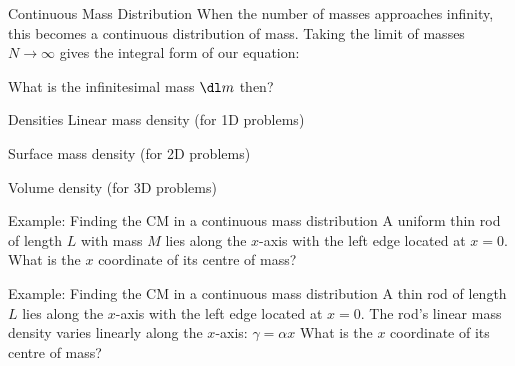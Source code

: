 \documentclass[12pt,compress,aspectratio=169]{beamer}
\begin{document}
\begin{frame}{Continuous Mass Distribution}
  When the number of masses approaches infinity, this becomes a continuous
  distribution of mass. Taking the limit of masses $N\rightarrow\infty$ gives
  the integral form of our equation:


  What is the infinitesimal mass $\dl m$ then?
\end{frame}



\begin{frame}{Densities}
  Linear mass density (for 1D problems)


  Surface mass density (for 2D problems)


  Volume density (for 3D problems)

\end{frame}



\begin{frame}[t]{Example: Finding the CM in a continuous mass distribution}
  A uniform thin rod of length $L$ with mass $M$ lies along the $x$-axis with
  the left edge located at $x=0$. What is the $x$ coordinate of its centre of
  mass?
  \begin{center}
  \end{center}
\end{frame}


\begin{frame}[t]{Example: Finding the CM in a continuous mass distribution}
  A thin rod of length $L$ lies along the $x$-axis with the left edge located
  at $x=0$. The rod's linear mass density varies linearly along the $x$-axis:
  $\gamma=\alpha x$ What is the $x$ coordinate of its centre of mass?
  \begin{center}
  \end{center}
\end{frame}
\end{document}

